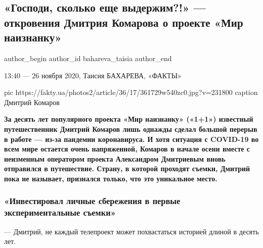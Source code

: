  
 
 
 
 
 
\subsection{«Господи, сколько еще выдержим?!» — откровения Дмитрия Комарова о проекте «Мир наизнанку»}
\label{sec:26_11_2020.news.ua.fakty.bahareva_taisia.1.komarov}
\ifcmt
	author_begin
   author_id bahareva_taisia
	author_end
\fi

13:40 — 26 ноября 2020, Таисия БАХАРЕВА, «ФАКТЫ»

\ifcmt
pic https://fakty.ua/photos2/article/36/17/361729w540zc0.jpg?v=231800
caption Дмитрий Комаров
\fi


\begin{leftbar}
	\bfseries
За десять лет популярного проекта «Мир наизнанку» («1+1») \textbf{известный
путешественник Дмитрий Комаров} лишь однажды сделал большой перерыв в работе —
из-за пандемии коронавируса. И хотя ситуация с COVID-19 во всем мире остается
очень напряженной, Комаров в начале осени вместе с неизменным оператором
проекта Александром Дмитриевым вновь отправился в путешествие. Страну, в
которой проходят съемки, Дмитрий пока не называет, признался только, что это
уникальное место.
\end{leftbar}

\subsubsection{«Инвестировал личные сбережения в первые экспериментальные съемки»}

— Дмитрий, не каждый телепроект может похвастаться историей длиной
в десять лет.

